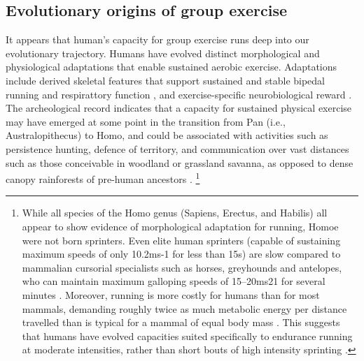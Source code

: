 \begin{CJK}{UTF8}{gbsn}
\subsection{Evolutionary origins of group exercise}
It appears that human’s capacity for group exercise runs deep into our evolutionary trajectory.  Humans have evolved distinct morphological and physiological adaptations that enable sustained aerobic exercise.  Adaptations include derived skeletal features that support sustained and stable bipedal running and respirattory function \citep[see ][]{Bramble2004}, and exercise-specific neurobiological reward \citep{Raichlen2012}.  The archeological record indicates that a capacity for sustained physical exercise may have emerged at some point in the transition from Pan (i.e., Australopithecus) to Homo, and could be associated with activities such as persistence hunting, defence of territory, and communication over vast distances such as those conceivable in woodland or grassland savanna, as opposed to dense canopy rainforests of pre-human ancestors \citep{Sands2012}.
  \footnote{While all species of the Homo genus (Sapiens, Erectus, and Habilis) all appear to show evidence of morphological adaptation for running, Homoe were not born sprinters.  Even elite human sprinters (capable of sustaining maximum speeds of only 10.2ms-1 for less than 15s) are slow compared to mammalian cursorial specialists such as horses, greyhounds and antelopes, who can maintain maximum galloping speeds of 15–20ms21 for several minutes \citep{Garland1983}.  Moreover, running is more costly for humans than for most mammals, demanding roughly twice as much metabolic energy per distance travelled than is typical for a mammal of equal body mass \citep{Taylor1982}.  This suggests that humans have evolved capacities suited specifically to endurance running at moderate intensities, rather than short bouts of high intensity sprinting \citep{Bramble2004}.}


\end{CJK}
